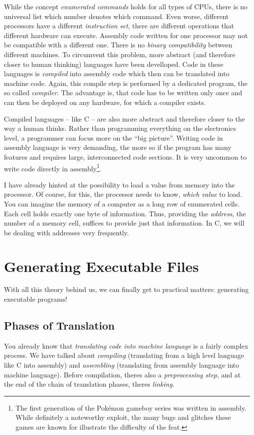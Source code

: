 While the concept \emph{enumerated commands} holds for all types of CPUs, there is no universal list which number denotes which command. Even worse, different processors have a different \emph{instruction set}, \ie there are different operations that different hardware can execute. Assembly code written for one processor may not be compatible with a different one. There is no \emph{binary compatibility} between different machines. To circumvent this problem, more abstract (and therefore closer to human thinking) languages have been develloped. Code in these languages is \emph{compiled} into assembly code which then can be translated into machine code. Again, this compile step is performed by a dedicated program, the so called \emph{compiler}. The advantage is, that code has to be written only once and can then be deployed on any hardware, for which a compiler exists.

Compiled languages -- like C -- are also more abstract and therefore closer to the way a human thinks. Rather than programming everything on the electronics level, a programmer can focus more on the \enquote{big picture}. Writing code in assembly language is very demanding, the more so if the program has many features and requires large, interconnected code sections. It is very uncommon to write code directly in assembly\footnote{The first generation of the Pokémon gameboy series was written in assembly. While definitely a noteworthy exploit, the many bugs and glitches these games are known for illustrate the difficulty of the feat.}.

I have already hinted at the possibility to load a value from memory into the processor. Of course, for this, the processor needs to know, \emph{which value} to load. You can imagine the memory of a computer as a long row of enumerated cells. Each cell holds exactly one byte of information. Thus, providing the \emph{address}, \ie the number of a memory cell, suffices to provide just that information. In C, we will be dealing with addresses very frequently.

\section{Generating Executable Files} \label{sec:Compile}
With all this theory behind us, we can finally get to practical matters: generating executable programs!

\subsection{Phases of Translation}
You already know that \emph{translating code into machine language} is a fairly complex process. We have talked about \emph{compiling} (translating from a high level language like C into assembly) and \emph{assembling} (translating from assembly language into machine language). Before compilation, theres also a \emph{preprocessing step}, and at the end of the chain of translation phases, theres \emph{linking}.

